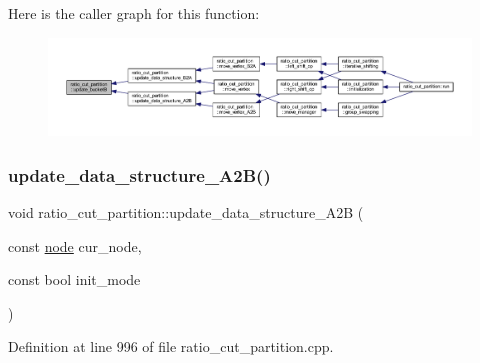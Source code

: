 Here is the caller graph for this function\+:\nopagebreak
\begin{figure}[H]
\begin{center}
\leavevmode
\includegraphics[width=350pt]{classratio__cut__partition_abe5d474e6d99c7bb200071d6484b5358_icgraph}
\end{center}
\end{figure}
\mbox{\label{classratio__cut__partition_acdb4b69b6c94f06f6997ccec296a281f}} 
\subsubsection{\texorpdfstring{update\+\_\+data\+\_\+structure\+\_\+\+A2\+B()}{update\_data\_structure\_A2B()}}
{\footnotesize\ttfamily void ratio\+\_\+cut\+\_\+partition\+::update\+\_\+data\+\_\+structure\+\_\+\+A2B (\begin{DoxyParamCaption}\item[{const \mbox{\hyperlink{classnode}{node}}}]{cur\+\_\+node,  }\item[{const bool}]{init\+\_\+mode }\end{DoxyParamCaption})\hspace{0.3cm}{\ttfamily [protected]}}



Definition at line 996 of file ratio\+\_\+cut\+\_\+partition.\+cpp.


